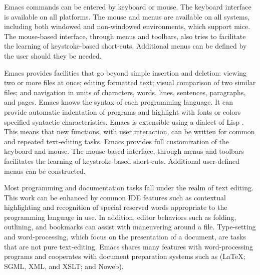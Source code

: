 \documentclass{article}
\begin{document}
Emacs commands can be entered by keyboard or mouse.  The keyboard
interface is available on all platforms.  The mouse and menus are
available on all systems, including both windowed and non-windowed
environments, which support mice.  The mouse-based interface, through
menus and toolbars, also tries to facilitate the learning of
keystroke-based short-cuts.  Additional menus can be defined by the
user should they be needed.


Emacs provides facilities that go beyond simple insertion and
deletion: viewing two or more files at once; editing formatted text;
visual comparison of two similar files; and navigation in units of
characters, words, lines, sentences, paragraphs, and pages.  Emacs
knows the syntax of each programming language.  It can provide
automatic indentation of programs and highlight with fonts or colors
specified syntactic characteristics.  Emacs is extensible using a
dialect of Lisp \citep{RChassell1999,PGraham:1996}.  This means that
new functions, with user interaction, can be written for common and
repeated text-editing tasks.  Emacs provides full customization of the
keyboard and mouse.  The mouse-based interface, through menus and
toolbars facilitates the learning of keystroke-based short-cuts.
Additional user-defined menus can be constructed.

Most programming and documentation tasks fall under the realm of text
editing.  This work can be enhanced by common IDE features such as
contextual highlighting and recognition of special reserved words
appropriate to the programming language in use.  In addition, editor
behaviors such as folding, outlining, and bookmarks can assist with
maneuvering around a file.  Type-setting and word-processing, which
focus on the presentation of a document, are tasks that are not pure
text-editing.  Emacs shares many features with word-processing
programs and cooperates with document preparation systems such as
(\LaTeX; SGML, XML, and XSLT; and Noweb).
\end{document}
